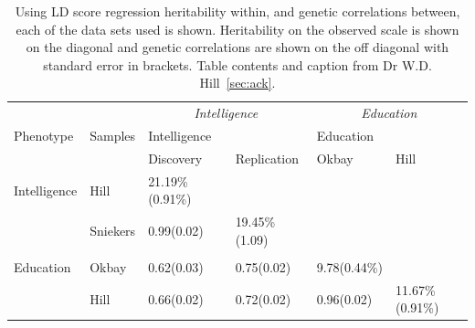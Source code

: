 










\begin{table}[]
    \centering
      \setlength{\extrarowheight}{2pt}
    \begin{tabular}{llllll}
    \toprule
       &  &\multicolumn{2}{c}{\textit{Intelligence}} & \multicolumn{2}{c}{\textit{Education}} \\
       \cmidrule{3-6}
       Phenotype & Samples & Intelligence & & Education &    \\
       \midrule
         & & Discovery & Replication & Okbay & Hill\\
         \midrule
         Intelligence & Hill & 21.19\%(0.91\%) & & & \\
         & Sniekers & 0.99(0.02) & 19.45\%(1.09) & & \\
         \\
         Education & Okbay & 0.62(0.03) & 0.75(0.02) & 9.78(0.44\%) &\\
         & Hill & 0.66(0.02) & 0.72(0.02) & 0.96(0.02)&11.67\%(0.91\%)\\
         \bottomrule
    \end{tabular}
    \caption[Heritability of samples]{Using LD score regression heritability within, and genetic correlations between, each of the data sets used is shown. Heritability on the observed scale is shown on the diagonal and genetic correlations are shown on the off diagonal with standard error in brackets. Table contents and caption from Dr W.D. Hill~\ref{sec:ack}. }
    \label{tab:supplementary LD regression hill}
\end{table}



